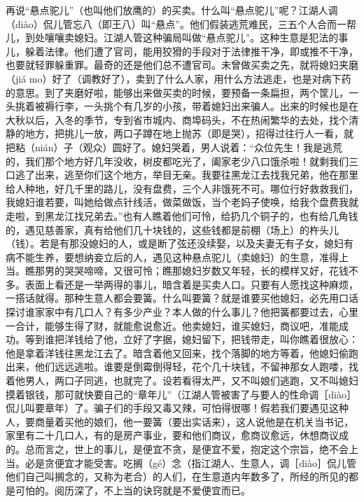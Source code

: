 \documentclass[12pt,UTF8]{ctexbook}
\begin{document}
再说“悬点驼儿”（也叫他们放鹰的）的买卖。什么叫“悬点驼儿”呢？江湖人调（diào）侃儿管忘八（即王八）叫“悬点”。他们假装逃荒难民，三五个人合而一帮儿，到处嚷嚷卖媳妇。江湖人管这种骗局叫做“悬点驼儿”。这种生意是犯法的事儿，躲着法律。他们遭了官司，能用狡猾的手段对于法律推干净，即或推不干净，也要就轻罪躲重罪。最奇的还是他们总不遭官司。未曾做买卖之先，就将媳妇夹磨（jiá mo）好了（调教好了），卖到了什么人家，用什么方法逃走，也是对病下药的意思。到了夹磨好啦，能够出来做买卖的时候，要预备一条扁担，两个筐儿，一头挑着被褥行李，一头挑个有几岁的小孩，带着媳妇出来骗人。出来的时候也是在大秋以后，入冬的季节，专到省市城内、商埠码头，不在热闹繁华的去处，找个清静的地方，把挑儿一放，两口子蹲在地上抛苏（即是哭），招得过往行人一看，就把粘（nián）子（观众）圆好了。媳妇哭着，男人说着：“众位先生！我是逃荒的，我们那个地方好几年没收，树皮都吃光了，阖家老少八口饿杀啦！就剩我们三口逃了出来，逃至你们这个地方，举目无亲。我要往黑龙江去找我兄弟，他在那里给人种地，好几千里的路儿，没有盘费，三个人非饿死不可。哪位行好救救我们，我媳妇谁若要，叫她给做点针线活，做菜做饭，当个老妈子使唤，给我个盘费我就走啦，到黑龙江找兄弟去。”也有人瞧着他们可怜，给扔几个铜子的，也有给几角钱的，遇见慈善家，真有给他们几十块钱的，这些钱都是前棚（场上）的杵头儿（钱）。若是有那没媳妇的人，或是断了弦还没续娶，以及夫妻无有子女，媳妇有病不能生养，要想纳妾立后的人，遇见这种悬点驼儿（卖媳妇）的生意，准得上当。瞧那男的哭哭啼啼，又很可怜；瞧那媳妇岁数又年轻，长的模样又好，花钱不多。表面上看还是一举两得的事儿，暗含着是买卖人口。只要有人愿找这种麻烦，一搭话就得。那种生意人都会要簧。什么叫要簧？就是谁要买他媳妇，必先用口话探讨谁家家中有几口人？有多少产业？本人做的什么事儿？他把簧都要过去，心里一合计，能够生得了财，就能愈说愈近。他卖媳妇，谁买媳妇，商议吧，准能成功。等到谁把洋钱给了他，立好了字据，媳妇留下，把钱带走，叫你瞧着很放心：他是拿着洋钱往黑龙江去了。暗含着他又回来，找个落脚的地方等着，他媳妇偷跑出来，他们远远逃啦。谁要是倒霉倒得轻，花个几十块钱，不留神那女人跑喽，找着他男人，两口子同逃，也就完了。设若看得太严，又不叫娘们逃跑，又不叫媳妇摸着银钱，那可就快要自己的“章年儿”（江湖人管被害了与要人的性命调［diào］侃儿叫要章年）了。骗子们的手段又毒又辣，可怕得很哪！假若我们要遇见这种人，要商量着买他的娘们，他一要簧（要出实话来），这人说他是在机关当书记，家里有二十几口人，有的是房产事业，要和他们商议，愈商议愈远，休想商议成的。总而言之，世上的事儿，是便宜不贪，是便宜不爱，抱定这个宗旨，绝不会上当。必是贪便宜才能受害。吃搁（gé）念（指江湖人、生意人，调［diào］侃儿管他们自己叫搁念的，又称为老合）的人们，在生意道内年数多了，所经的所见的都是可怕的。阅历深了，不上当的诀窍就是不爱便宜而已。
\end{document}
